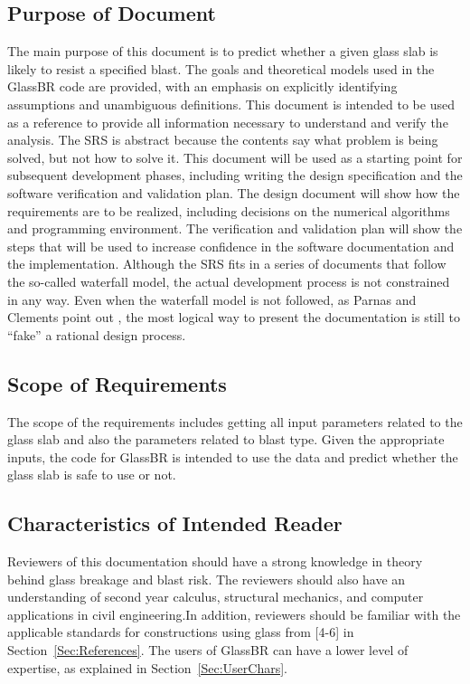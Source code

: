 \documentclass[12pt]{article}
\begin{document}
\subsection{Purpose of Document}
\label{Sec:DocPurpose}
The main purpose of this document is to predict whether a given glass slab is likely to resist a specified blast. The goals and theoretical models used in the GlassBR code are provided, with an emphasis on explicitly identifying assumptions and unambiguous definitions. This document is intended to be used as a reference to provide all information necessary to understand and verify the analysis. The SRS is abstract because the contents say what problem is being solved, but not how to solve it.
This document will be used as a starting point for subsequent development phases, including writing the design specification and the software verification and validation plan. The design document will show how the requirements are to be realized, including decisions on the numerical algorithms and programming environment. The verification and validation plan will show the steps that will be used to increase confidence in the software documentation and the implementation. Although the SRS fits in a series of documents that follow the so-called waterfall model, the actual development process is not constrained in any way. Even when the waterfall model is not followed, as Parnas and Clements point out \cite{parnasClements1986}, the most logical way to present the documentation is still to ``fake'' a rational design process.
\subsection{Scope of Requirements}
\label{Sec:ReqsScope}
The scope of the requirements includes getting all input parameters related to the glass slab and also the parameters related to blast type. Given the appropriate inputs, the code for GlassBR is intended to use the data and predict whether the glass slab is safe to use or not.
\subsection{Characteristics of Intended Reader}
\label{Sec:ReaderChars}
Reviewers of this documentation should have a strong knowledge in theory behind glass breakage and blast risk. The reviewers should also have an understanding of second year calculus, structural mechanics, and computer applications in civil engineering.In addition, reviewers should be familiar with the applicable standards for constructions using glass from {[}4-6{]} in Section~\ref{Sec:References}. The users of GlassBR can have a lower level of expertise, as explained in Section~\ref{Sec:UserChars}.
\end{document}
